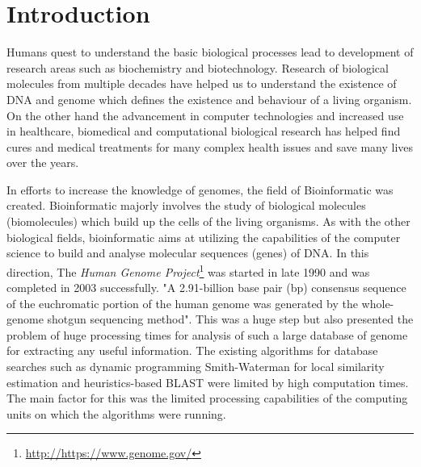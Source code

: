 \documentclass[12pt,twoside]{article}
\begin{document}
\section{Introduction}
\label{sec:introduction}

Humans quest to understand the basic biological processes lead to development of research areas such as
biochemistry and biotechnology. Research of biological molecules from multiple decades have helped us to understand
the existence of DNA and genome which defines the existence and behaviour of a living organism.
On the other hand the advancement in computer technologies and increased use in healthcare, biomedical
and computational biological research has helped find cures and medical treatments for many complex health
issues and save many lives over the years.

In efforts to increase the knowledge of genomes, the field of Bioinformatic was created. Bioinformatic majorly involves
the study of biological molecules (biomolecules) which build up the cells of the living organisms. As with the other biological fields,
bioinformatic aims at utilizing the capabilities of the computer science to build and analyse molecular sequences (genes) of DNA.
In this direction, The \emph{Human Genome Project}\footnote{\url{http://https://www.genome.gov/}}  was started in late 1990 and was
completed in 2003 successfully. "A 2.91-billion base pair (bp) consensus sequence of the euchromatic portion of
the human genome was generated by the whole-genome shotgun sequencing method"\cite{venter_sequence_2001}. This was a huge
step but also presented the problem of huge processing times for analysis of such a large database of genome for extracting any
useful information. The existing algorithms for database searches such as dynamic programming Smith-Waterman \cite{smith_identification_1981}
for local similarity estimation and heuristics-based BLAST \cite{altschul_basic_1990} were limited by
high computation times. The main factor for this was the limited processing capabilities of the computing units
on which the algorithms were running.
\end{document}
